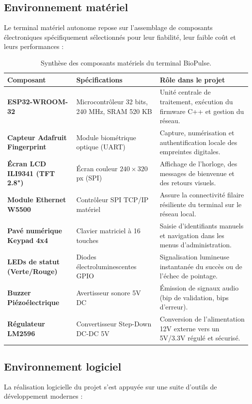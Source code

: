 \documentclass[12pt,a4paper]{report}
\begin{document}
\subsection{Environnement matériel}
Le terminal matériel autonome repose sur l'assemblage de composants électroniques spécifiquement sélectionnés pour leur fiabilité, leur faible coût et leurs performances :

\begin{table}[H]
\centering
\small
\caption{Synthèse des composants matériels du terminal BioPulse.}
\label{tab:materiel}
\begin{tabular}{|p{4.5cm}|p{5cm}|p{6cm}|}
\hline
\rowcolor{mariemblue!20} \textbf{Composant} & \textbf{Spécifications} & \textbf{Rôle dans le projet} \\ \hline
\textbf{ESP32-WROOM-32} & Microcontrôleur 32 bits, 240 MHz, SRAM 520 KB & Unité centrale de traitement, exécution du firmware C++ et gestion du réseau. \\ \hline
\textbf{Capteur Adafruit Fingerprint} & Module biométrique optique (UART) & Capture, numérisation et authentification locale des empreintes digitales. \\ \hline
\textbf{Écran LCD ILI9341 (TFT 2.8")} & Écran couleur $240 \times 320$ px (SPI) & Affichage de l'horloge, des messages de bienvenue et des retours visuels. \\ \hline
\textbf{Module Ethernet W5500} & Contrôleur SPI TCP/IP matériel & Assure la connectivité filaire résiliente du terminal sur le réseau local. \\ \hline
\textbf{Pavé numérique Keypad 4x4} & Clavier matriciel à 16 touches & Saisie d'identifiants manuels et navigation dans les menus d'administration. \\ \hline
\textbf{LEDs de statut (Verte/Rouge)} & Diodes électroluminescentes GPIO & Signalisation lumineuse instantanée du succès ou de l'échec de pointage. \\ \hline
\textbf{Buzzer Piézoélectrique} & Avertisseur sonore 5V DC & Émission de signaux audio (bip de validation, bips d'erreur). \\ \hline
\textbf{Régulateur LM2596} & Convertisseur Step-Down DC-DC 5V & Conversion de l'alimentation 12V externe vers un 5V/3.3V régulé et sécurisé. \\ \hline
\end{tabular}
\end{table}

\subsection{Environnement logiciel}
La réalisation logicielle du projet s'est appuyée sur une suite d'outils de développement modernes :
\end{document}
